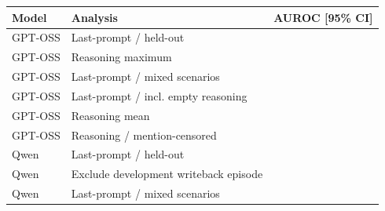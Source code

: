 \begin{tabular}{llc}
\toprule
Model & Analysis & AUROC [95\% CI] \\
\midrule
GPT-OSS & Last-prompt / held-out & \gptossCallProbe{} \gptossCallProbeCI{} \\
GPT-OSS & Reasoning maximum & \gptossCallReasoning{} \gptossCallReasoningCI{} \\
GPT-OSS & Last-prompt / mixed scenarios & \gptossRobustPooled{} \gptossRobustPooledCI{} \\
GPT-OSS & Last-prompt / incl. empty reasoning & \gptossRobustAllReplies{} \gptossRobustAllRepliesCI{} \\
GPT-OSS & Reasoning mean & \gptossReasoningMean{} \gptossReasoningMeanCI{} \\
GPT-OSS & Reasoning / mention-censored & \gptossReasoningCensored{} \gptossReasoningCensoredCI{} \\
Qwen & Last-prompt / held-out & \qwenCallProbe{} \qwenCallProbeCI{} \\
Qwen & Exclude development writeback episode & \qwenNoSourceWriteback{} \qwenNoSourceWritebackCI{} \\
Qwen & Last-prompt / mixed scenarios & \qwenPerCallMixedScenario{} \qwenPerCallMixedScenarioCI{} \\
\bottomrule
\end{tabular}
